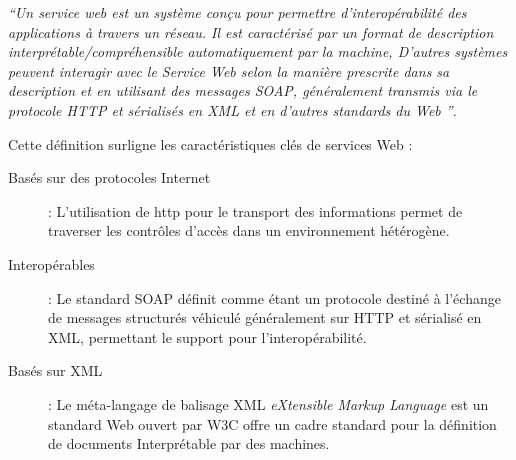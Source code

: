   \emph{``Un service web est un système conçu pour permettre
    d'interopérabilité des applications à travers un réseau.  Il est
    caractérisé par un format de description
    interprétable/compréhensible automatiquement par la machine,
    D'autres systèmes peuvent interagir avec le Service Web selon la
    manière prescrite dans sa description et en utilisant des messages
    SOAP, généralement transmis via le protocole
    HTTP et sérialisés en XML et en d'autres standards du Web ''}.

  Cette définition surligne les caractéristiques clés de services Web
  \cite{fremantle2002enterprise}:

  \SpecialItem
  \begin{description}
  \item[Basés sur des protocoles Internet] : L'utilisation de
    \acrshort{http} pour le transport des informations permet de
    traverser les contrôles d'accès dans un environnement hétérogène.
  
  \item[Interopérables] : Le standard \textsc{SOAP}
    \cite{box2000simple} définit comme étant un protocole destiné à
    l'échange de messages structurés véhiculé généralement sur
    \textsc{HTTP} et sérialisé en \textsc{XML}, permettant le support
    pour l'interopérabilité.
      
  \item[Basés sur XML] : Le méta-langage de balisage \textsc{XML}
    \textit{eXtensible Markup Language} est un standard Web ouvert par
    \textsc{W3C} \cite{bray1998extensible} offre un cadre standard
    pour la définition de documents Interprétable par des machines.
  \end{description}
    

